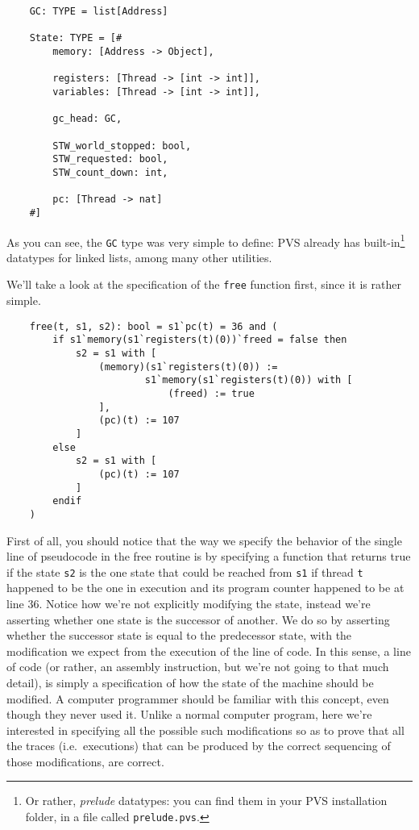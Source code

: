 \begin{verbatim}
    GC: TYPE = list[Address]

    State: TYPE = [#
        memory: [Address -> Object],

        registers: [Thread -> [int -> int]],
        variables: [Thread -> [int -> int]],

        gc_head: GC,

        STW_world_stopped: bool,
        STW_requested: bool,
        STW_count_down: int,

        pc: [Thread -> nat]
    #]
\end{verbatim}

As you can see, the \texttt{GC} type was very simple to define: PVS already has built-in\footnote{%
	Or rather, \emph{prelude} datatypes: you can find them in your PVS installation folder, in a file called \texttt{prelude.pvs}.
} datatypes for linked lists, among many other utilities.

We'll take a look at the specification of the \texttt{free} function first, since it is rather simple.
\begin{verbatim}
	free(t, s1, s2): bool = s1`pc(t) = 36 and (
	    if s1`memory(s1`registers(t)(0))`freed = false then
	        s2 = s1 with [
	            (memory)(s1`registers(t)(0)) :=
	                    s1`memory(s1`registers(t)(0)) with [
	                        (freed) := true
	            ],
	            (pc)(t) := 107
	        ]
	    else
	        s2 = s1 with [
	            (pc)(t) := 107
	        ]
	    endif
	)
\end{verbatim}

First of all, you should notice that the way we specify the behavior of the single line of pseudocode in the free routine is by specifying a function that returns true if the state \texttt{s2} is the one state that could be reached from \texttt{s1} if thread \texttt{t} happened to be the one in execution and its program counter happened to be at line 36.
Notice how we're not explicitly modifying the state, instead we're asserting whether one state is the successor of another.
We do so by asserting whether the successor state is equal to the predecessor state, with the modification we expect from the execution of the line of code.
In this sense, a line of code (or rather, an assembly instruction, but we're not going to that much detail), is simply a specification of how the state of the machine should be modified.
A computer programmer should be familiar with this concept, even though they never used it.
Unlike a normal computer program, here we're interested in specifying all the possible such modifications so as to prove that all the traces (i.e.\ executions) that can be produced by the correct sequencing of those modifications, are correct.

